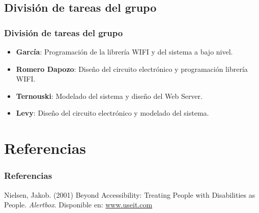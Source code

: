 \subsection{División de tareas del grupo}
\begin{frame}
	\frametitle{División de tareas del grupo}
	\begin{itemize}
		\item \textbf{García}: Programación de la librería WIFI y del sistema a bajo nivel.
		\item \textbf{Romero Dapozo}: Diseño del circuito electrónico y programación librería WIFI.
		\item \textbf{Ternouski}: Modelado del sistema y diseño del Web Server.
		\item \textbf{Levy}: Diseño del circuito electrónico y modelado del sistema.
	\end{itemize}
\end{frame}

\section{Referencias}

\begin{frame}
	\frametitle{Referencias}
	\footnotesize{
	\begin{thebibliography}{99}
		 Nielsen, Jakob. (2001)
		\newblock Beyond Accessibility: Treating People with Disabilities as People.
		\newblock \emph{Alertbox}.
		Disponible en:
		\href{http://www.useit.com/alertbox/20011111.html}{www.useit.com}
	\end{thebibliography}
	}
\end{frame}